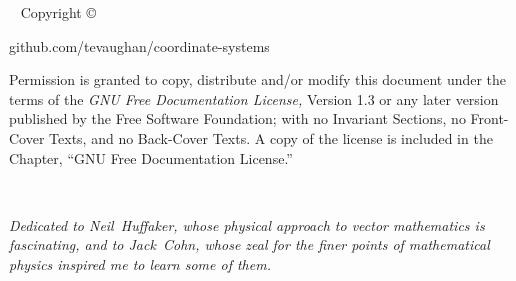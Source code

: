 

\frontmatter

\blankpage

\newpage\thispagestyle{empty}
\vfill
{}
\vfill

\maketitle

\newpage
\begin{fullwidth}
~\vfill
\thispagestyle{empty}
\setlength{\parindent}{0pt}
\setlength{\parskip}{\baselineskip}
Copyright \copyright\ \the\year\ \thanklessauthor

\par{}

\par{github.com/tevaughan/coordinate-systems}

\par Permission is granted to copy, distribute and/or modify this document
   under the terms of the {\it GNU Free Documentation License,} Version 1.3 or
   any later version published by the Free Software Foundation; with no
   Invariant Sections, no Front-Cover Texts, and no Back-Cover Texts.  A copy
   of the license is included in the Chapter, ``GNU Free Documentation
   License.''

\end{fullwidth}

\tableofcontents



\cleardoublepage
~\vfill
\begin{doublespace}
\noindent\fontsize{18}{22}\selectfont\itshape
\nohyphenation
Dedicated to \mbox{Neil Huffaker}, whose physical approach to vector
   mathematics is fascinating, and to \mbox{Jack Cohn}, whose zeal for the
   finer points of mathematical physics inspired me to learn some of them.
\end{doublespace}
\vfill
\vfill


